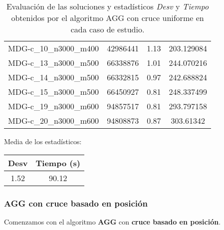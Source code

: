 \documentclass{article}
\begin{document}
\begin{table}[H]
\begin{tabular}{|cccc|}
		MDG-c\_10\_n3000\_m400 & 42986441 & 1.13 & 203.129084\\
		MDG-c\_13\_n3000\_m500 & 66338876 & 1.01 & 244.070216\\
		MDG-c\_14\_n3000\_m500 & 66332815 & 0.97 & 242.688824\\
		MDG-c\_15\_n3000\_m500 & 66450927 & 0.81 & 248.337499\\
		MDG-c\_19\_n3000\_m600 & 94857517 & 0.81 & 293.797158\\
		MDG-c\_20\_n3000\_m600 & 94808873 & 0.87 & 303.61342\\
		\hline
	\end{tabular}
	\caption{Evaluación de las soluciones y estadísticos \emph{Desv} y \emph{Tiempo} obtenidos por el algoritmo AGG con cruce uniforme
		en cada caso de estudio.}
	\label{tab:agg-uniforme}
\end{table}

Media de los estadísticos:
\begin{table}[H]
	\centering
	\begin{tabular}{|cc|}
		\hline
		Desv & Tiempo (s)\\ \hline
		 1.52 & 90.12 \\
		\hline
	\end{tabular}
\end{table}

\pagebreak

\subsubsection*{AGG con cruce basado en posición}

Comenzamos con el algoritmo \textbf{AGG} con \textbf{cruce basado en posición}.
\end{document}
